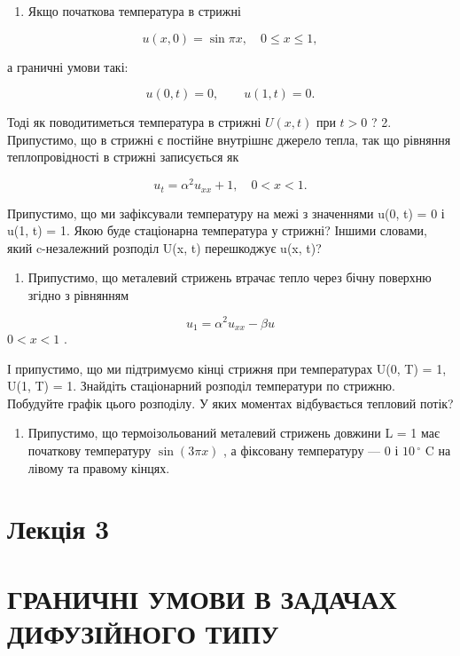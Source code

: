 \documentclass[
  ukrainian,
]{article}
\providecommand{\tightlist}{%
  \setlength{\itemsep}{0pt}\setlength{\parskip}{0pt}}
\begin{document}
\begin{enumerate}
\def\labelenumi{\arabic{enumi}.}
\tightlist
\item
  Якщо початкова температура в стрижні
\end{enumerate}

\[u(x, 0) = \sin \pi x, \quad 0 \leqslant x \leqslant 1,\]

а граничні умови такі:

\[
u(0, t) = 0, \qquad u(1, t) = 0.
\]

Тоді як поводитиметься температура в стрижні \(U(x, t)\) при \(t > 0\) ?
2. Припустимо, що в стрижні є постійне внутрішнє джерело тепла, так що
рівняння теплопровідності в стрижні записується як

\[u_t = \alpha^2 u_{xx} + 1, \quad 0 < x < 1.\]

Припустимо, що ми зафіксували температуру на межі з значеннями u(0, t) =
0 і u(1, t) = 1. Якою буде стаціонарна температура у стрижні? Іншими
словами, який c-незалежний розподіл U(x, t) перешкоджує u(x, t)?

\begin{enumerate}
\def\labelenumi{\arabic{enumi}.}
\setcounter{enumi}{2}
\tightlist
\item
  Припустимо, що металевий стрижень втрачає тепло через бічну поверхню
  згідно з рівнянням
\end{enumerate}

\[u_1 = \alpha^2 u_{xx} - \beta u\] \(0 < x < 1\) .

І припустимо, що ми підтримуємо кінці стрижня при температурах U(0, T) =
1, U(1, T) = 1. Знайдіть стаціонарний розподіл температури по стрижню.
Побудуйте графік цього розподілу. У яких моментах відбувається тепловий
потік?

\begin{enumerate}
\def\labelenumi{\arabic{enumi}.}
\setcounter{enumi}{3}
\tightlist
\item
  Припустимо, що термоізольований металевий стрижень довжини L = 1 має
  початкову температуру \(\sin(3\pi x)\) , а фіксовану температуру --- 0
  і \(10\,^{\circ}\) C на лівому та правому кінцях.
\end{enumerate}

\section{Лекція 3}\label{ux43bux435ux43aux446ux456ux44f-3}

\section{ГРАНИЧНІ УМОВИ В ЗАДАЧАХ ДИФУЗІЙНОГО
ТИПУ}\label{ux433ux440ux430ux43dux438ux447ux43dux456-ux443ux43cux43eux432ux438-ux432-ux437ux430ux434ux430ux447ux430ux445-ux434ux438ux444ux443ux437ux456ux439ux43dux43eux433ux43e-ux442ux438ux43fux443}
\end{document}
